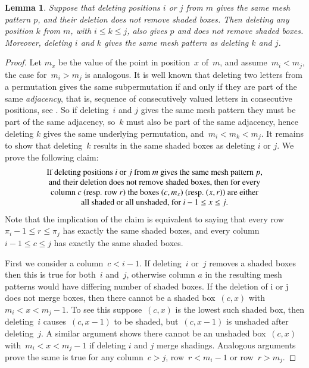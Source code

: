 \documentclass[preprint,11pt]{elsarticle}
\newtheorem{lem}[thm]{Lemma}\crefname{lem}{Lemma}{Lemmas}
\numberwithin{equation}{section}
\numberwithin{figure}{section}
\numberwithin{thm}{section}
\begin{document}
\begin{lem}\label{lem:adj}
Suppose that deleting positions $i$ or $j$ from $m$ gives the same mesh pattern $p$, and their deletion does not remove shaded boxes.
Then deleting any position $k$ from $m$, with $i\le k\le j$, also gives $p$ and does not remove shaded boxes.
Moreover, deleting $i$ and $k$ gives the same mesh pattern as deleting $k$ and $j$.
\end{lem}

\begin{proof}
Let $m_x$ be the value of the point in position~$x$ of~$m$, and assume~$m_i<m_j$, the case for~$m_i>m_j$ is analogous.
 It is well known that deleting two letters from a permutation gives the same subpermutation if and only if they are part
 of the same \emph{adjacency}, that is, sequence of consecutively valued letters in consecutive positions, see \cite{Smith15}. So if deleting~$i$ and
 $j$ gives the same mesh pattern they must be part of the same adjacency, so~$k$ must also be part of the same adjacency,
 hence deleting $k$ gives the same underlying permutation, and~$m_i<m_k<m_j$.
 It remains to show that deleting~$k$ results in the same shaded boxes as deleting $i$ or $j$. We prove the following claim:
 \begin{equation*}
  \begin{tabular}{c}
   If deleting positions $i$ or $j$ from $m$ gives the same mesh pattern $p$,\\
   and their deletion does not remove shaded boxes, then for every\\ column~$c$
   (resp. row~$r$) the boxes~$(c,m_x)$ (resp.~$(x,r)$) are either\\ all shaded or all unshaded, for~$i-1\le x\le j$.
  \end{tabular}
 \end{equation*}
 Note that the implication of the claim is equivalent to saying that every row~$\pi_i-1\le r\le \pi_j$ has exactly the same shaded boxes,
 and every column~$i-1\le c\le j$ has exactly the same shaded boxes.

First we consider a column~$c<i-1$. If deleting~$i$ or~$j$ removes a shaded boxes then this is true for both~$i$ and~$j$,
 otherwise column $a$ in the resulting mesh patterns would have differing number of shaded boxes. If the deletion of i or j does not merge boxes,
 then there cannot be a shaded box~$(c,x)$ with~$m_i<x<m_j-1$. To see this suppose~$(c,x)$ is the lowest such shaded box, then deleting~$i$
 causes~$(c,x-1)$ to be shaded, but~$(c,x-1)$ is unshaded after deleting~$j$. A similar argument shows there cannot be an unshaded box~$(c,x)$ with~$m_i<x<m_j-1$
 if deleting $i$ and $j$ merge shadings. Analogous arguments prove the same is true for any column~$c>j$, row~$r<m_i-1$ or row~$r>m_j$.


\end{proof}
\end{document}
